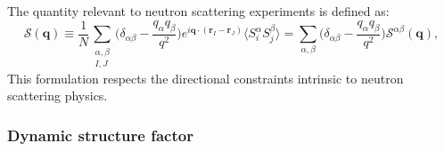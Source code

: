 \documentclass[aps, prx, nofootinbib, superscriptaddress]{revtex4-2}
\begin{document}
The quantity relevant to neutron scattering experiments is defined as:
\begin{equation}
    \mathcal{S} (\mathbf{q}) 
    \equiv 
    \frac{1}{N} 
    \sum_{\substack{\alpha, \beta \\ I, J}}
    \Big(
    \delta_{\alpha\beta} - \frac{q_{\alpha} q_{\beta}}{q^{2}} 
    \Big)
    e^{i \mathbf{q} \cdot ( \mathbf{r}_{I} - \mathbf{r}_{J} ) }
    \langle 
    S_{i}^{\alpha}
    S_{j}^{\beta} 
    \rangle
    = 
    \sum_{\alpha, \beta} 
    \Big( \delta_{\alpha\beta} - \frac{q_{\alpha} q_{\beta}}{q^{2}} \Big)
    \mathcal{S}^{\alpha\beta} (\mathbf{q}) ,
\end{equation}
This formulation respects the directional constraints intrinsic to neutron scattering physics.



\subsubsection{Dynamic structure factor} 
\end{document}
